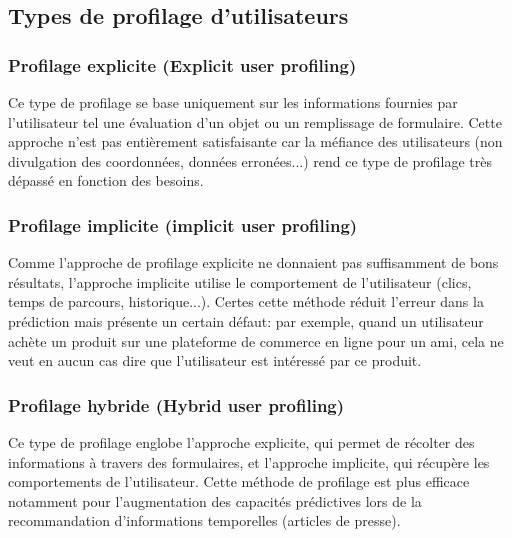     \subsection{Types de profilage d'utilisateurs}
        \subsubsection{Profilage explicite (Explicit user profiling)}
        Ce type de profilage se base uniquement sur les informations fournies par l'utilisateur tel une évaluation d'un objet ou un remplissage de formulaire. Cette approche n'est pas entièrement satisfaisante car la méfiance des utilisateurs (non divulgation des coordonnées, données erronées...) rend ce type de profilage très dépassé en fonction des besoins.

        \subsubsection{Profilage implicite (implicit user profiling)}
        Comme l'approche de profilage explicite ne donnaient pas suffisamment de bons résultats, l'approche implicite utilise le comportement de l'utilisateur (clics, temps de parcours, historique...). Certes cette méthode réduit l'erreur dans la prédiction mais présente un certain défaut: par exemple, quand un utilisateur achète un produit sur une plateforme de commerce en ligne pour un ami, cela ne veut en aucun cas dire que l'utilisateur est intéressé par ce produit.

        \subsubsection{Profilage hybride (Hybrid user profiling)}
        Ce type de profilage englobe l'approche explicite, qui permet de récolter des informations à travers des formulaires, et l'approche implicite, qui récupère les comportements de l'utilisateur. Cette méthode de profilage est plus efficace notamment pour l'augmentation des capacités prédictives lors de la recommandation d'informations temporelles (articles de presse).

